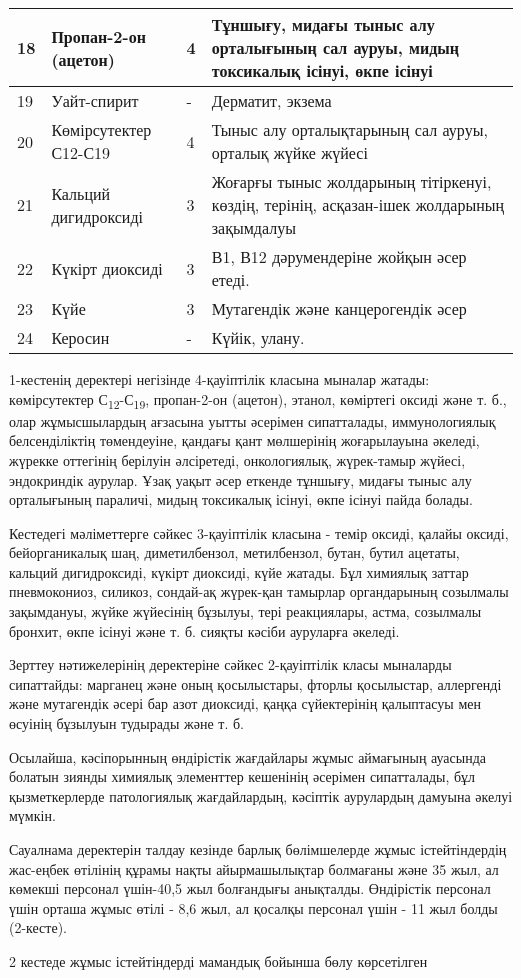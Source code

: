 \begin{longtable}[c]{|l|p{}|p{}|p{}|}
18 & Пропан-2-он (ацетон) & 4 & Тұншығу, мидағы тыныс алу орталығының сал ауруы, мидың токсикалық ісінуі, өкпе ісінуі \\ \hline
19 & Уайт-спирит & - & Дерматит, экзема \\ \hline
20 & Көмірсутектер С12-С19 & 4 & Тыныс алу орталықтарының сал ауруы, орталық жүйке жүйесі \\ \hline
21 & Кальций дигидроксиді & 3 & Жоғарғы тыныс жолдарының тітіркенуі, көздің, терінің, асқазан-ішек жолдарының зақымдалуы \\ \hline
22 & Күкірт диоксиді & 3 & В1, В12 дәрумендеріне жойқын әсер етеді. \\ \hline
23 & Күйе & 3 & Мутагендік және канцерогендік әсер \\ \hline
24 & Керосин & - & Күйік, улану. \\ \hline
\end{longtable}

\begin{multicols}{2}
1-кестенің деректері негізінде 4-қауіптілік класына мыналар жатады:
көмірсутектер С\textsubscript{12}-С\textsubscript{19}, пропан-2-он
(ацетон), этанол, көміртегі оксиді және т. б., олар жұмысшылардың
ағзасына уытты әсерімен сипатталады, иммунологиялық белсенділіктің
төмендеуіне, қандағы қант мөлшерінің жоғарылауына әкеледі, жүрекке
оттегінің берілуін әлсіретеді, онкологиялық, жүрек-тамыр жүйесі,
эндокриндік аурулар. Ұзақ уақыт әсер еткенде тұншығу, мидағы тыныс алу
орталығының параличі, мидың токсикалық ісінуі, өкпе ісінуі пайда болады.

Кестедегі мәліметтерге сәйкес 3-қауіптілік класына - темір оксиді,
қалайы оксиді, бейорганикалық шаң, диметилбензол, метилбензол, бутан,
бутил ацетаты, кальций дигидроксиді, күкірт диоксиді, күйе жатады. Бұл
химиялық заттар пневмокониоз, силикоз, сондай-ақ жүрек-қан тамырлар
органдарының созылмалы зақымдануы, жүйке жүйесінің бұзылуы, тері
реакциялары, астма, созылмалы бронхит, өкпе ісінуі және т. б. сияқты
кәсіби ауруларға әкеледі.

Зерттеу нәтижелерінің деректеріне сәйкес 2-қауіптілік класы мыналарды
сипаттайды: марганец және оның қосылыстары, фторлы қосылыстар,
аллергенді және мутагендік әсері бар азот диоксиді, қаңқа сүйектерінің
қалыптасуы мен өсуінің бұзылуын тудырады және т. б.

Осылайша, кәсіпорынның өндірістік жағдайлары жұмыс аймағының ауасында
болатын зиянды химиялық элементтер кешенінің әсерімен сипатталады, бұл
қызметкерлерде патологиялық жағдайлардың, кәсіптік аурулардың дамуына
әкелуі мүмкін.

Сауалнама деректерін талдау кезінде барлық бөлімшелерде жұмыс
істейтіндердің жас-еңбек өтілінің құрамы нақты айырмашылықтар болмағаны
және 35 жыл, ал көмекші персонал үшін-40,5 жыл болғандығы анықталды.
Өндірістік персонал үшін орташа жұмыс өтілі - 8,6 жыл, ал қосалқы
персонал үшін - 11 жыл болды (2-кесте).

2 кестеде жұмыс істейтіндерді мамандық бойынша бөлу көрсетілген
\end{multicols}


